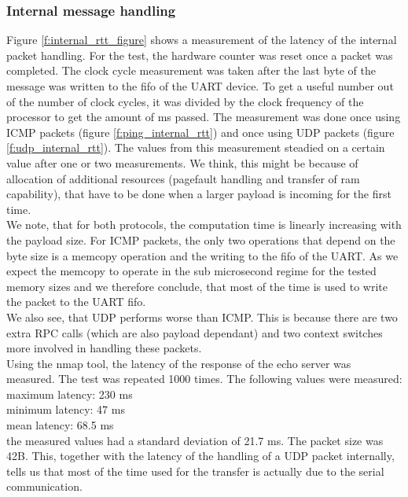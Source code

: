 \subsubsection{Internal message handling \label{ss:network_internal_message_handling}}
Figure \ref{f:internal_rtt_figure} shows a measurement of the latency of the internal packet handling. For the test, the hardware counter was reset once a packet was completed. The clock cycle measurement was taken after the last byte of the message was written to the fifo of the UART device. To get a useful number out of the number of clock cycles, it was divided by the clock frequency of the processor to get the amount of ms passed. The measurement was done once using ICMP packets (figure \ref{f:ping_internal_rtt}) and once using UDP packets (figure \ref{f:udp_internal_rtt}). The values from this measurement steadied on a certain value after one or two measurements. We think, this might be because of allocation of additional resources (pagefault handling and transfer of ram capability), that have to be done when a larger payload is incoming for the first time. \\
We note, that for both protocols, the computation time is linearly increasing with the payload size. For ICMP packets, the only two operations that depend on the byte size is a memcopy operation and the writing to the fifo of the UART. As we expect the memcopy to operate in the sub microsecond regime for the tested memory sizes and we therefore conclude, that most of the time is used to write the packet to the UART fifo. \\
We also see, that UDP performs worse than ICMP. This is because there are two extra RPC calls (which are also payload dependant) and two context switches more involved in handling these packets. \\
Using the nmap tool, the latency of the response of the echo server was measured. The test was repeated 1000 times. The following values were measured:\\
maximum latency: 230 ms\\
minimum latency: 47 ms\\
mean latency: 68.5 ms\\
the measured values had a standard deviation of 21.7 ms. The packet size was 42B. This, together with the latency of the handling of a UDP packet internally, tells us that most of the time used for the transfer is actually due to the serial communication.

